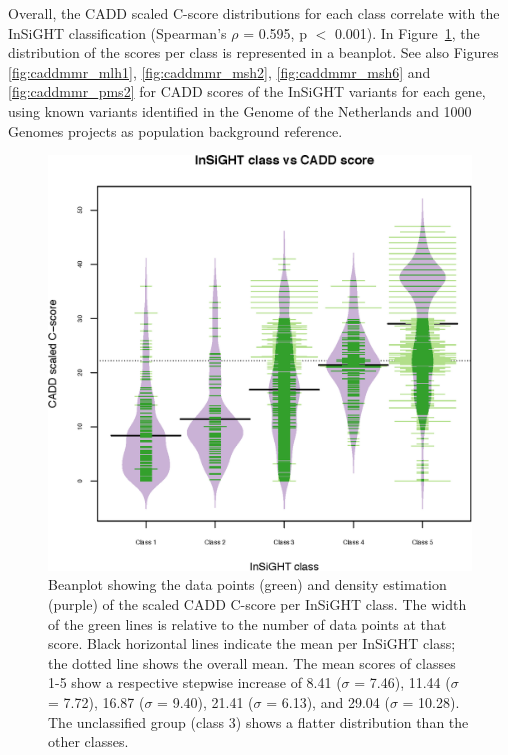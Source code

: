 Overall, the CADD scaled C-score distributions for each class correlate with the InSiGHT classification (Spearman’s $\rho$ = 0.595, p $<$ 0.001).
In Figure~\ref{fig:beanplot}, the distribution of the scores per class is represented in a beanplot\cite{Kampstra_2008}.
See also Figures \ref{fig:caddmmr_mlh1}, \ref{fig:caddmmr_msh2}, \ref{fig:caddmmr_msh6} and \ref{fig:caddmmr_pms2} for CADD scores of the InSiGHT variants for each gene, using known variants identified in the Genome of the Netherlands\cite{Boomsma_2014,Francioli_2014} and 1000 Genomes\cite{McVean_2012} projects as population background reference.

\begin{figure}[htb]
\centering
\includegraphics[width=1.0\linewidth]{img/caddmmr_beanplot}
\caption[Beanplot showing CADD score data and density]{
    \label{fig:beanplot}
    Beanplot\cite{Kampstra_2008} showing the data points (green) and density estimation (purple) of the scaled CADD C-score per InSiGHT class.
    The width of the green lines is relative to the number of data points at that score.
    Black horizontal lines indicate the mean per InSiGHT class; the dotted line shows the overall mean.
    The mean scores of classes 1-5 show a respective stepwise increase of 8.41 ($\sigma$ = 7.46), 11.44 ($\sigma$ = 7.72), 16.87 ($\sigma$ = 9.40), 21.41 ($\sigma$ = 6.13), and 29.04 ($\sigma$ = 10.28).
    The unclassified group (class 3) shows a flatter distribution than the other classes.}
\end{figure}

